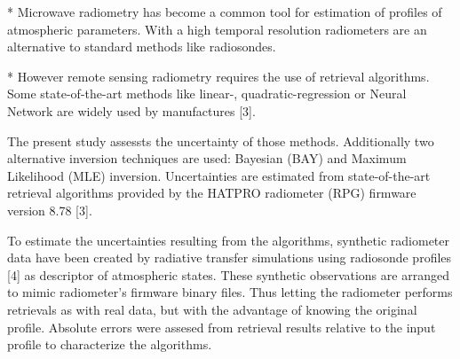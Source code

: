 \documentclass[landscape,paperwidth=1189mm,paperheight=841mm,fontscale=0.4,margin=.7cm]{baposter}
\begin{document}
\begin{poster}
{* Microwave radiometry has become a common tool for estimation of profiles of atmospheric parameters. With a high temporal resolution radiometers are an alternative to standard methods like radiosondes.

* However remote sensing radiometry requires the use of retrieval algorithms. Some state-of-the-art methods like linear-, quadratic-regression or Neural Network are widely used by manufactures [3].

The present study assessts the uncertainty of those methods. Additionally two alternative inversion techniques are used: Bayesian (BAY) and Maximum Likelihood (MLE) inversion. Uncertainties are estimated from state-of-the-art retrieval algorithms provided by the HATPRO radiometer (RPG) firmware version 8.78 [3].

To estimate the uncertainties resulting from the algorithms, synthetic radiometer data have been created by radiative transfer simulations using radiosonde profiles [4] as descriptor of atmospheric states. These synthetic observations are arranged to mimic radiometer's firmware binary files. Thus letting the radiometer performs retrievals as with real data, but with the advantage of knowing the original profile. Absolute errors were assesed from retrieval results relative to the input profile to characterize the algorithms.

}
\end{poster}
\end{document}
